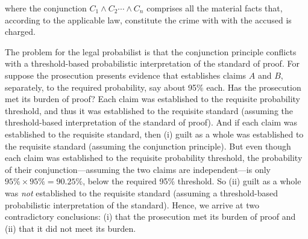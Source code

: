 \documentclass[
  10pt,
  dvipsnames,enabledeprecatedfontcommands]{scrartcl}
\newcommand{\et}{\wedge}
\begin{document}
\noindent where the conjunction \(C_1 \et C_2 \cdots \et C_n\) comprises
all the material facts that, according to the applicable law, constitute
the crime with with the accused is charged.

The problem for the legal probabilist is that the conjunction principle
conflicts with a
threshold-based probabilistic
interpretation of the standard of proof. For suppose the prosecution
presents evidence that establishes claims \(A\) and \(B\), separately,
to the required probability, say about 95\%
each.
Has the prosecution met its burden of proof? Each claim was established
to the requisite probability threshold, and thus it was established to
the requisite standard (assuming the threshold-based interpretation of
the standard of proof). And if each claim was established to the
requisite standard, then (i) guilt as a whole was established to the
requisite standard (assuming the conjunction principle). But even though
each claim was established to the requisite probability threshold, the
probability of their conjunction---assuming the two claims are
independent---is only \(95\%\times95\%=90.25\%\), below the required
95\% threshold. So (ii) guilt as a whole was \textit{not} established to
the requisite standard (assuming a threshold-based probabilistic
interpretation of the standard). Hence, we arrive at two contradictory
conclusions: (i) that the prosecution met its burden of proof and (ii)
that it did not meet its burden.
\end{document}
